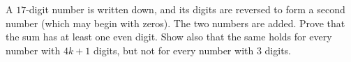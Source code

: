A $17$-digit number is written down, and its digits are reversed to form a second number (which may begin with zeros). The two numbers are added. Prove that the sum has at least one even digit. Show also that the same holds for every number with $4k+1$ digits, but not for every number with $3$ digits.
